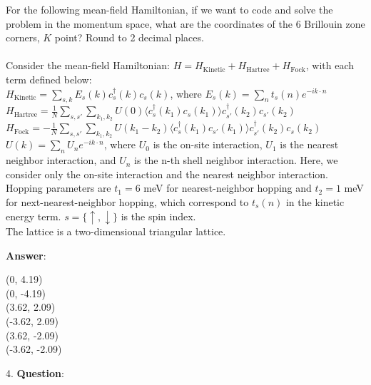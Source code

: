 \documentclass{article}
\begin{document}
   For the following mean-field Hamiltonian, if we want to code and solve the problem in the momentum space, what are the coordinates of the 6 Brillouin zone corners, $K$ point? Round to 2 decimal places. \\ \\Consider the mean-field Hamiltonian: $H = H_{\text{Kinetic}} + H_{\text{Hartree}} +H_{\text{Fock}}$, with each term defined below: \\$H_{\text{Kinetic}} = \sum_{s, k} E_s(k) c^\dagger_s(k) c_s(k)$, where $E_s(k)=\sum_{n} t_s(n) e^{-i k \cdot n}$  \\$H_{\text{Hartree}} = \frac{1}{N} \sum_{s, s'} \sum_{k_1, k_2} U(0) \langle c_s^\dagger(k_1) c_s(k_1) \rangle c_{s'}^\dagger(k_2) c_{s'}(k_2)$ \\$H_{\text{Fock}} = -\frac{1}{N} \sum_{s, s'} \sum_{k_1, k_2} U(k_1 - k_2) \langle c_s^\dagger(k_1) c_{s'}(k_1) \rangle c_{s'}^\dagger(k_2) c_s(k_2)$ \\$U(k) = \sum_{n} U_n e^{-i k \cdot n}$, where $U_0$ is the on-site interaction, $U_1$ is the nearest neighbor interaction, and $U_n$ is the n-th shell neighbor interaction. Here, we consider only the on-site interaction and the nearest neighbor interaction. \\Hopping parameters are $t_1 = 6$ meV for nearest-neighbor hopping and $t_2 = 1$ meV for next-nearest-neighbor hopping, which correspond to $t_s(n)$ in the kinetic energy term. $s = \{\uparrow, \downarrow\}$ is the spin index. \\The lattice is a two-dimensional triangular lattice.

   \textbf{Answer}:

   (0,  4.19) \\
(0, -4.19) \\
(3.62, 2.09) \\
(-3.62, 2.09) \\
(3.62, -2.09) \\
(-3.62, -2.09) \\


\clearpage

4. \textbf{Question}:
\end{document}
